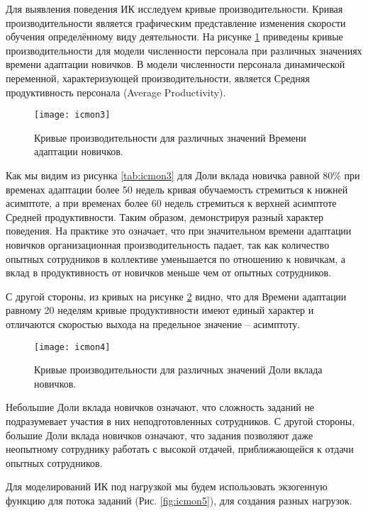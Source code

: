 Для выявления поведения ИК исследуем кривые производительности. 
Кривая производительности является графическим представление изменения скорости обучения определённому виду деятельности. 
На рисунке \ref{fig:icmon3} приведены кривые производительности для модели численности персонала при различных значениях времени адаптации новичков. 
В модели численности персонала динамической переменной, характеризующей производительности, является Средняя продуктивность персонала (Average Productivity).

\begin{figure}[H]
  \caption{Кривые производительности для различных значений Времени адаптации новичков.}
  \centering
    \texttt{[image: icmon3]}
  \label{fig:icmon3}
\end{figure}  

Как мы видим из рисунка \ref{tab:icmon3} для Доли вклада новичка равной 80\% при временах адаптации более 50 недель кривая обучаемость стремиться к нижней асимптоте, а при временах более 60 недель стремиться к верхней асимптоте Средней продуктивности. 
Таким образом, демонстрируя разный характер поведения. 
На практике это означает, что при значительном времени адаптации новичков организационная производительность падает, так как количество опытных сотрудников в коллективе уменьшается по отношению к новичкам, а вклад в продуктивность от новичков меньше чем от опытных сотрудников. 

С другой стороны, из кривых на рисунке \ref{fig:icmon4} видно, что для Времени адаптации равному 20 неделям кривые продуктивности имеют единый характер и отличаются скоростью выхода на предельное значение – асимптоту. 

\begin{figure}[H]
  \caption{Кривые производительности для различных значений Доли вклада новичков.}
  \centering
    \texttt{[image: icmon4]}
  \label{fig:icmon4}
\end{figure} 

Небольшие Доли вклада новичков означают, что сложность заданий не подразумевает участия в них неподготовленных сотрудников. 
С другой стороны, большие Доли вклада новичков означают, что задания позволяют даже неопытному сотруднику работать с высокой отдачей, приближающейся к отдачи опытных сотрудников.

Для моделирований ИК под нагрузкой мы будем использовать экзогенную функцию для потока заданий (Рис. \ref{fig:icmon5}), для создания разных нагрузок.

